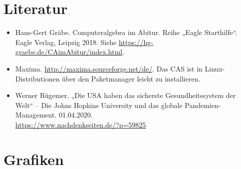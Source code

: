 \documentclass[a4paper,11pt]{article}
\begin{document}
\section{Literatur}

\begin{itemize}
\item Hans-Gert Gräbe. Computeralgebra im Abitur. Reihe „Eagle Starthilfe“.
  Eagle Verlag, Leipzig 2018.  Siehe
  \url{https://hg-graebe.de/CAimAbitur/index.html}.
\item Maxima. \url{http://maxima.sourceforge.net/de/}. Das CAS ist in
  Linux-Distributionen über den Paketmanager leicht zu installieren.
\item Werner Rügemer. „Die USA haben das sicherste Gesundheitssystem der Welt“
  – Die Johns Hopkins University und das globale Pandemien-Management.
  01.04.2020.\\ \url{https://www.nachdenkseiten.de/?p=59825}
\end{itemize}

\section{Grafiken}
\end{document}
